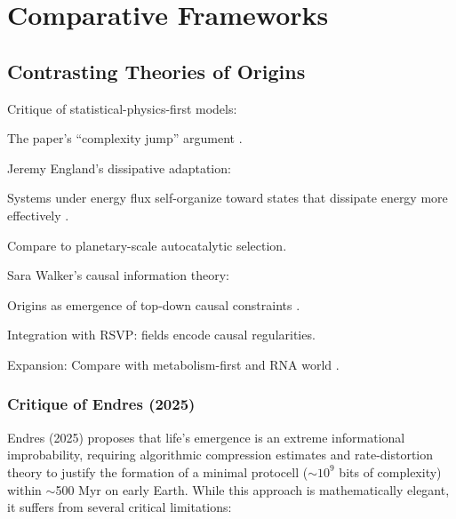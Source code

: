 \documentclass[openany]{book}
\begin{document}
\part{Comparative Frameworks}

\chapter{Contrasting Theories of Origins}
Critique of statistical-physics-first models:

The paper’s “complexity jump” argument \citep{endres2025}.

Jeremy England’s dissipative adaptation:

Systems under energy flux self-organize toward states that dissipate energy more effectively \citep{england2013}.

Compare to planetary-scale autocatalytic selection.

Sara Walker’s causal information theory:

Origins as emergence of top-down causal constraints \citep{walker2013}.

Integration with RSVP: fields encode causal regularities.

Expansion: Compare with metabolism-first \citep{martin2015} and RNA world \citep{joyce1989}.

\section{Critique of Endres (2025)}
Endres (2025) proposes that life’s emergence is an extreme informational improbability, requiring algorithmic compression estimates and rate-distortion theory to justify the formation of a minimal protocell ($\sim10^9$ bits of complexity) within $\sim$500 Myr on early Earth. While this approach is mathematically elegant, it suffers from several critical limitations:
\end{document}
